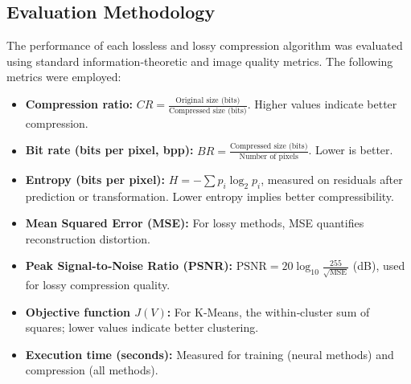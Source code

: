 







\subsection{Evaluation Methodology}

The performance of each lossless and lossy compression algorithm was evaluated using standard information‑theoretic and image quality metrics. The following metrics were employed:

\begin{itemize}
    \item \textbf{Compression ratio:} $CR = \frac{\text{Original size (bits)}}{\text{Compressed size (bits)}}$. Higher values indicate better compression.
    \item \textbf{Bit rate (bits per pixel, bpp):} $BR = \frac{\text{Compressed size (bits)}}{\text{Number of pixels}}$. Lower is better.
    \item \textbf{Entropy (bits per pixel):} $H = -\sum p_i \log_2 p_i$, measured on residuals after prediction or transformation. Lower entropy implies better compressibility.
    \item \textbf{Mean Squared Error (MSE):} For lossy methods, MSE quantifies reconstruction distortion.
    \item \textbf{Peak Signal‑to‑Noise Ratio (PSNR):} $\text{PSNR} = 20 \log_{10} \frac{255}{\sqrt{\text{MSE}}}$ (dB), used for lossy compression quality.
    \item \textbf{Objective function $J(V)$:} For K‑Means, the within‑cluster sum of squares; lower values indicate better clustering.
    \item \textbf{Execution time (seconds):} Measured for training (neural methods) and compression (all methods).
\end{itemize}

